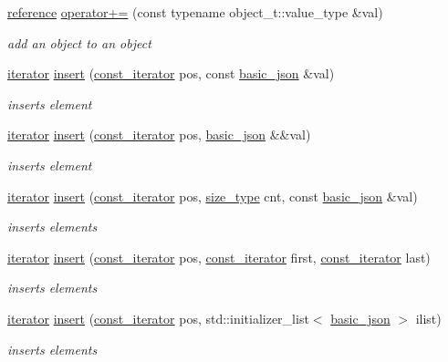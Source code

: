 \begin{DoxyCompactItemize}
\hyperlink{a00025_a3ec8e17be8732fe436e9d6733f52b7a3}{reference} \hyperlink{a00025_a9486a272e034c0548305d7a12f3045e6}{operator+=} (const typename object\+\_\+t\+::value\+\_\+type \&val)
\begin{DoxyCompactList}\small\item\em add an object to an object \end{DoxyCompactList}\item 
\hyperlink{a00079}{iterator} \hyperlink{a00025_a7f7bbb3a9efef2e2442f538a24c1c47b}{insert} (\hyperlink{a00038}{const\+\_\+iterator} pos, const \hyperlink{a00025}{basic\+\_\+json} \&val)
\begin{DoxyCompactList}\small\item\em inserts element \end{DoxyCompactList}\item 
\hyperlink{a00079}{iterator} \hyperlink{a00025_a8468efcfcd95db15f46887b29924ed5c}{insert} (\hyperlink{a00038}{const\+\_\+iterator} pos, \hyperlink{a00025}{basic\+\_\+json} \&\&val)
\begin{DoxyCompactList}\small\item\em inserts element \end{DoxyCompactList}\item 
\hyperlink{a00079}{iterator} \hyperlink{a00025_a624025acfcf64364d98424402b837bc6}{insert} (\hyperlink{a00038}{const\+\_\+iterator} pos, \hyperlink{a00025_a1579a8f72a230358d6cd1a6e8a62859b}{size\+\_\+type} cnt, const \hyperlink{a00025}{basic\+\_\+json} \&val)
\begin{DoxyCompactList}\small\item\em inserts elements \end{DoxyCompactList}\item 
\hyperlink{a00079}{iterator} \hyperlink{a00025_aeaa0644fd6b99af364e772092268dfd6}{insert} (\hyperlink{a00038}{const\+\_\+iterator} pos, \hyperlink{a00038}{const\+\_\+iterator} first, \hyperlink{a00038}{const\+\_\+iterator} last)
\begin{DoxyCompactList}\small\item\em inserts elements \end{DoxyCompactList}\item 
\hyperlink{a00079}{iterator} \hyperlink{a00025_aadb4e5be88221e5e28cdb752332f3d13}{insert} (\hyperlink{a00038}{const\+\_\+iterator} pos, std\+::initializer\+\_\+list$<$ \hyperlink{a00025}{basic\+\_\+json} $>$ ilist)
\begin{DoxyCompactList}\small\item\em inserts elements \end{DoxyCompactList}\item 

\end{DoxyCompactItemize}
